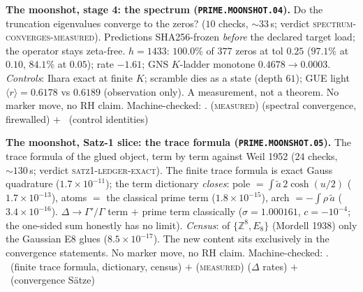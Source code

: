 \par\smallskip\noindent\textbf{The moonshot, stage 4: the spectrum
(\texttt{PRIME.MOONSHOT.04}).}
Do the truncation eigenvalues converge to the zeros? ($10$ checks,
${\sim}33$\,s; verdict \textsc{spectrum-converges-measured}).
Predictions SHA256-frozen \emph{before} the declared target load;
the operator stays zeta-free.  $h=1433$: $100.0\%$ of $377$ zeros at
tol $0.25$ ($97.1\%$ at $0.10$, $84.1\%$ at $0.05$); rate $-1.61$;
GNS $K$-ladder monotone $0.4678\to0.0003$.  \emph{Controls}: Ihara
exact at finite $K$; scramble dies as a state (depth $61$); GUE
light $\langle r\rangle=0.6178$ vs $0.6189$ (observation only).  A
measurement, not a theorem.  No marker move, no RH claim.
Machine-checked: .
(\textsc{measured}) (spectral convergence, firewalled) $+$ \mE\
(control identities)
\par\smallskip


\par\smallskip\noindent\textbf{The moonshot, Satz-1 slice: the trace
formula (\texttt{PRIME.MOONSHOT.05}).}
The trace formula of the glued object, term by term against Weil
1952 ($24$ checks, ${\sim}130$\,s; verdict
\textsc{satz1-ledger-exact}).  The finite trace formula is exact
Gauss quadrature ($1.7\times10^{-11}$); the term dictionary
\emph{closes}: pole $=\int\tilde a\,2\cosh(u/2)$
($1.7\times10^{-13}$), atoms $=$ the classical prime term
($1.8\times10^{-15}$), arch $=-\int\rho\,\tilde a$
($3.4\times10^{-16}$).  $\Delta\to\Gamma'/\Gamma$ term $+$ prime
term classically ($\sigma=1.000161$, $c=-10^{-4}$; the one-sided sum
honestly has no limit).  \emph{Census}: of $\{\mathbb{Z}^8,E_8\}$
(Mordell 1938) only the Gaussian E8 glues ($8.5\times10^{-17}$).
The new content sits exclusively in the convergence statements.  No
marker move, no RH claim.
Machine-checked: .
\mE\ (finite trace formula, dictionary, census) $+$
(\textsc{measured}) ($\Delta$ rates) $+$ \mO\ (convergence S\"atze)
\par\smallskip


